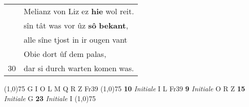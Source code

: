 \documentclass[8pt,a4paper,notitlepage]{article}
\begin{document}
\begin{table}[ht]
\begin{minipage}[t]{0.5\linewidth}
\begin{tabular}{rl}
 & Melianz von Liz ez \textbf{hie} wol reit.\\ 
 & sîn tât was vor ûz \textbf{sô} \textbf{bekant},\\ 
 & alle sîne tjost in ir ougen vant\\ 
 & Obie dort ûf dem palas,\\ 
30 & dar si durch warten komen was.\\ 
\end{tabular}
\scriptsize
\line(1,0){75} \newline
G I O L M Q R Z Fr39 \newline
\line(1,0){75} \newline
\textbf{10} \textit{Initiale} I L Fr39  \textbf{9} \textit{Initiale} O R Z  \textbf{15} \textit{Initiale} G  \textbf{23} \textit{Initiale} I  \newline
\line(1,0){75} \newline

\end{minipage}
\end{table}
\end{document}
